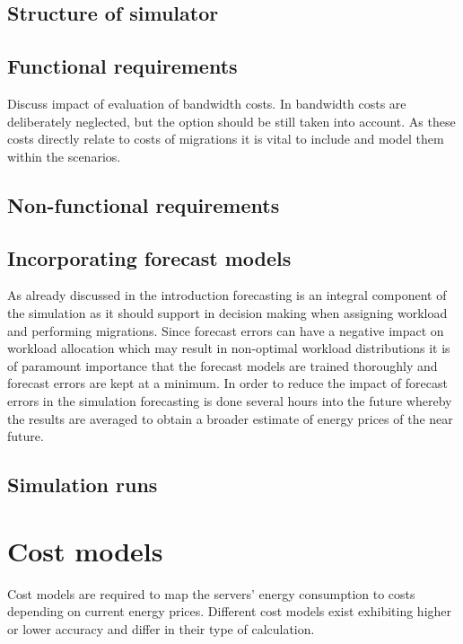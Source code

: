 \subsection{Structure of simulator}

\subsection{Functional requirements}

Discuss impact of evaluation of bandwidth costs. In \cite{rao2010minimizing} %
bandwidth costs are deliberately neglected, but the option should be still taken into account. As these costs directly relate to costs of migrations it is vital to include and model them within the scenarios. 

\subsection{Non-functional requirements}

\subsection{Incorporating forecast models}

As already discussed in the introduction %
forecasting is an integral component of the simulation as it should support in decision making when assigning workload and performing migrations. Since forecast errors can have a negative impact on workload allocation which may result in non-optimal workload distributions \cite{de2013study} it is of paramount importance that the forecast models are trained thoroughly and forecast errors are kept at a minimum. In order to reduce the impact of forecast errors in the simulation forecasting is done several hours into the future whereby the results are averaged to obtain a broader estimate of energy prices of the near future. 


\subsection{Simulation runs}



\section{Cost models}

Cost models are required to map the servers' energy consumption to costs depending on current energy prices. Different cost models exist exhibiting higher or lower accuracy and differ in their type of calculation. 

